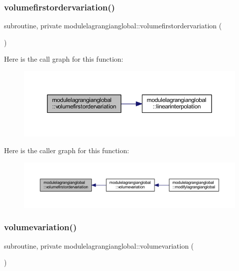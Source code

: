 \subsubsection{\texorpdfstring{volumefirstordervariation()}{volumefirstordervariation()}}
{\footnotesize\ttfamily subroutine, private modulelagrangianglobal\+::volumefirstordervariation (\begin{DoxyParamCaption}{ }\end{DoxyParamCaption})\hspace{0.3cm}{\ttfamily [private]}}

Here is the call graph for this function\+:\nopagebreak
\begin{figure}[H]
\begin{center}
\leavevmode
\includegraphics[width=350pt]{namespacemodulelagrangianglobal_a3b4d2f6226b807632b46704ab7cd6944_cgraph}
\end{center}
\end{figure}
Here is the caller graph for this function\+:\nopagebreak
\begin{figure}[H]
\begin{center}
\leavevmode
\includegraphics[width=350pt]{namespacemodulelagrangianglobal_a3b4d2f6226b807632b46704ab7cd6944_icgraph}
\end{center}
\end{figure}
\mbox{\label{namespacemodulelagrangianglobal_af49b1a80eb0ff491949cf2b360fb430f}} 
\subsubsection{\texorpdfstring{volumevariation()}{volumevariation()}}
{\footnotesize\ttfamily subroutine, private modulelagrangianglobal\+::volumevariation (\begin{DoxyParamCaption}{ }\end{DoxyParamCaption})\hspace{0.3cm}{\ttfamily [private]}}

